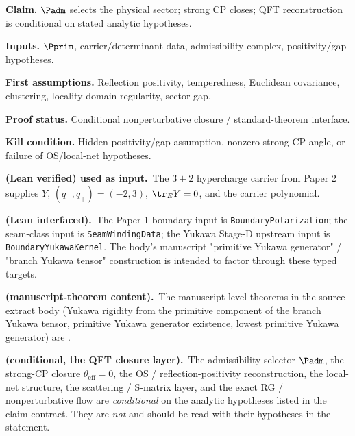 \begin{tfptclaimcontract}
\textbf{Claim.} $\Padm$ selects the physical sector; strong CP closes; QFT reconstruction is conditional on stated analytic hypotheses.\par
\textbf{Inputs.} $\Pprim$, carrier/determinant data, admissibility complex, positivity/gap hypotheses.\par
\textbf{First assumptions.} Reflection positivity, temperedness, Euclidean covariance, clustering, locality-domain regularity, sector gap.\par
\textbf{Proof status.} Conditional nonperturbative closure / standard-theorem interface.\par
\textbf{Kill condition.} Hidden positivity/gap assumption, nonzero strong-CP angle, or failure of OS/local-net hypotheses.\par
\end{tfptclaimcontract}

\begin{tfptstatusbox}
\textbf{ (Lean verified) used as input.}\ The $3+2$
hypercharge carrier from Paper 2 supplies $Y$,
$(q_-,q_+) = (-2,3)$, $\tr_E Y = 0$, and the carrier polynomial.

\smallskip
\textbf{ (Lean interfaced).}\ The Paper-1 boundary
input is \texttt{BoundaryPolarization}; the seam-class input
is \texttt{SeamWindingData}; the Yukawa Stage-D upstream input
is \texttt{BoundaryYukawaKernel}. The body's manuscript
"primitive Yukawa generator" / "branch Yukawa tensor"
construction is intended to factor through these typed
targets.

\smallskip
\textbf{ (manuscript-theorem content).}\ The
manuscript-level theorems in the source-extract body
(Yukawa rigidity from the primitive component of the branch
Yukawa tensor, primitive Yukawa generator existence, lowest
primitive Yukawa generator) are .

\smallskip
\textbf{ (conditional, the QFT closure layer).}\ The
admissibility selector $\Padm$, the strong-CP closure
$\theta_{\mathrm{eff}} = 0$, the OS / reflection-positivity
reconstruction, the local-net structure, the scattering /
S-matrix layer, and the exact RG / nonperturbative flow are
\emph{conditional} on the analytic hypotheses listed in the
claim contract. They are \emph{not}  and should be
read with their hypotheses in the statement.
\end{tfptstatusbox}

\tableofcontents

